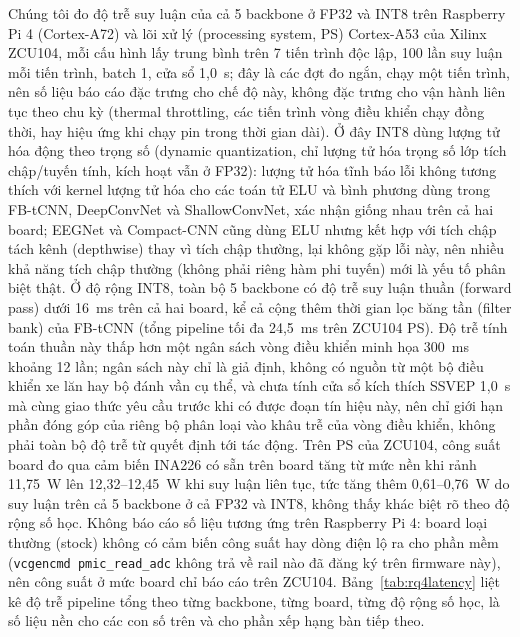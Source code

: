 \documentclass[11pt,a4paper,twoside,asymmetric]{article}
\begin{document}
Chúng tôi đo độ trễ suy luận của cả 5 backbone ở FP32 và INT8 trên Raspberry Pi 4 (Cortex-A72) và
lõi xử lý (processing system, PS) Cortex-A53 của Xilinx ZCU104, mỗi cấu hình lấy trung bình trên 7
tiến trình độc lập, 100 lần suy luận mỗi tiến trình, batch 1, cửa sổ 1,0~s; đây là các đợt đo ngắn, chạy một tiến trình, nên số liệu báo cáo đặc trưng cho chế độ này, không đặc trưng cho vận hành liên tục theo chu kỳ (thermal throttling, các tiến trình vòng điều khiển chạy đồng thời, hay hiệu ứng khi chạy pin trong thời gian dài). Ở đây INT8 dùng lượng tử
hóa động theo trọng số (dynamic quantization, chỉ lượng tử hóa trọng số lớp tích chập/tuyến tính,
kích hoạt vẫn ở FP32): lượng tử hóa tĩnh báo lỗi không tương thích với kernel lượng tử hóa cho các
toán tử ELU và bình phương dùng trong FB-tCNN, DeepConvNet và ShallowConvNet, xác nhận giống nhau
trên cả hai board; EEGNet và Compact-CNN cũng dùng ELU nhưng kết hợp với tích chập tách kênh
(depthwise) thay vì tích chập thường, lại không gặp lỗi này, nên nhiều khả năng tích chập thường
(không phải riêng hàm phi tuyến) mới là yếu tố phân biệt thật. Ở độ rộng INT8, toàn bộ 5 backbone có
độ trễ suy luận thuần (forward pass) dưới 16~ms trên cả hai board, kể cả cộng thêm thời gian lọc
băng tần (filter bank) của FB-tCNN (tổng pipeline tối đa 24,5~ms trên ZCU104 PS). Độ trễ tính toán
thuần này thấp hơn một ngân sách vòng điều khiển minh họa 300~ms khoảng 12 lần; ngân sách này chỉ là
giả định, không có nguồn từ một bộ điều khiển xe lăn hay bộ đánh vần cụ thể, và chưa tính cửa sổ
kích thích SSVEP 1,0~s mà cùng giao thức yêu cầu trước khi có được đoạn tín hiệu này, nên chỉ giới
hạn phần đóng góp của riêng bộ phân loại vào khâu trễ của vòng điều khiển, không phải toàn bộ độ trễ
từ quyết định tới tác động. Trên PS của ZCU104, công suất board đo qua cảm biến INA226 có sẵn trên
board tăng từ mức nền khi rảnh 11,75~W lên 12,32--12,45~W khi suy luận liên tục, tức tăng thêm
0,61--0,76~W do suy luận trên cả 5 backbone ở cả FP32 và INT8, không thấy khác biệt rõ theo độ rộng
số học. Không báo cáo số liệu tương ứng trên Raspberry Pi 4: board loại thường (stock) không có cảm
biến công suất hay dòng điện lộ ra cho phần mềm (\texttt{vcgencmd pmic\_read\_adc} không trả về rail
nào đã đăng ký trên firmware này), nên công suất ở mức board chỉ báo cáo trên ZCU104. Bảng~\ref{tab:rq4latency} liệt kê độ trễ pipeline tổng theo từng backbone, từng board, từng độ rộng số học, là số liệu nền cho các con số trên và cho phần xếp hạng bàn tiếp theo.
\end{document}
